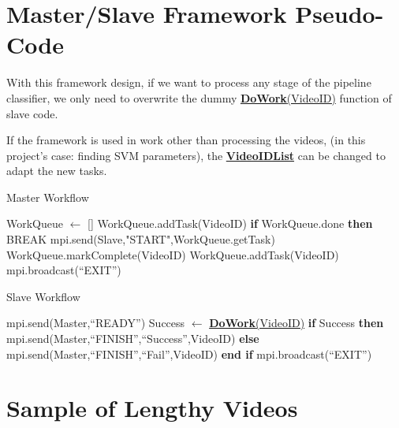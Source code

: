 \documentclass[bsc,logo,twoside,fullspacing,parskip]{infthesis}
\begin{document}
\begin{appendices}

\chapter{Master/Slave Framework Pseudo-Code}
\label{apped:msf}

With this framework design, if we want to process any stage of the pipeline classifier, we only need to overwrite the dummy \underline{\textbf{DoWork}(VideoID)} function of slave code.

If the framework is used in work other than processing the videos, (in this project's case: finding SVM parameters), the  \underline{\textbf{VideoIDList}} can be changed to adapt the new tasks.

\begin{algorithm}
\caption{Master Workflow}
\begin{algorithmic}
\STATE WorkQueue $\leftarrow$ []
	\STATE WorkQueue.addTask(VideoID)
\ENDFOR
{}
		\STATE \textbf{if} WorkQueue.done \textbf{then} BREAK 
		\STATE mpi.send(Slave,"START",WorkQueue.getTask)
	\ENDFOR
		\STATE WorkQueue.markComplete(VideoID)
			\STATE WorkQueue.addTask(VideoID)
		\ENDIF
	\ENDFOR
\ENDWHILE
\STATE mpi.broadcast(``EXIT'')
\end{algorithmic} 
\end{algorithm}

\begin{algorithm}
\caption{Slave Workflow}
\begin{algorithmic}
	\STATE mpi.send(Master,``READY'')
		\STATE Success $\leftarrow$ \underline{\textbf{DoWork}(VideoID)}
		\STATE \textbf{if} Success \textbf{then}
		\STATE \hspace{10pt}mpi.send(Master,``FINISH'',``Success'',VideoID)
		\STATE \textbf{else}
		\STATE \hspace{10pt}mpi.send(Master,``FINISH'',``Fail'',VideoID)
		\STATE \textbf{end if}
	\ENDIF
\ENDWHILE
\STATE mpi.broadcast(``EXIT'')
\end{algorithmic} 
\end{algorithm}

\chapter{Sample of Lengthy Videos}
\label{append:samplelong}


\end{appendices}
\end{document}
